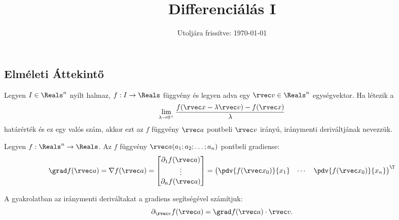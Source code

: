 \documentclass[a4paper, 12pt, fleqn]{scrartcl}
\title{Differenciálás I}
\date{Utoljára frissítve: \today}
\begin{document}
\maketitle
\subsection{Elméleti Áttekintő}

\begin{definition}
  Legyen $I \in \Reals^n$ nyílt halmaz, $f: I \to \Reals$ függvény és
  legyen adva egy $\rvec v \in \Reals^n$ egységvektor. Ha létezik a
  $$
    \lim_{\lambda \to 0^+} \frac{
      f(\rvec x - \lambda \rvec v) - f(\rvec x)
    }{
      \lambda
    }
  $$
  határérték és ez egy valós szám, akkor ezt az $f$ függvény $\rvec a$
  pontbeli $\rvec v$ irányú, iránymenti deriváltjának nevezzük.
\end{definition}

\begin{definition}[Gradiens]
  Legyen $f: \Reals^n \to \Reals$. Az $f$ függvény
  $\rvec a(a_{1}; a_{2}; \ldots; a_{n})$ pontbeli gradiense:
  \def\arraystretch{1.5}
  $$
    \grad f(\rvec a) = \nabla f(\rvec a) = \begin{bmatrix}
      \partial_1 f(\rvec a) \\
      \vdots                \\
      \partial_n f(\rvec a)
    \end{bmatrix} = \begin{pmatrix}
      \displaystyle\pdv{f(\rvec x_0)}{x_1} &
      \cdots                               &
      \displaystyle\pdv{f(\rvec x_0)}{x_n}
    \end{pmatrix}^\T
  $$
\end{definition}

\begin{note}
  A gyakrolatban az iránymenti deriváltakat a gradiens segítségével számítjuk:
  $$
    \partial_{\rvec v} f(\rvec a) = \grad f(\rvec a) \cdot \rvec v
    \text.
  $$
\end{note}
\end{document}
